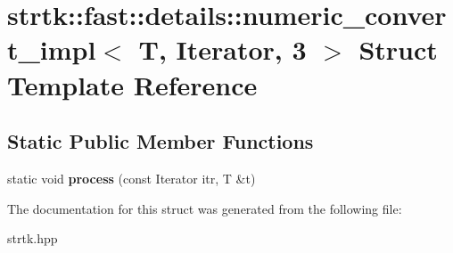 \hypertarget{structstrtk_1_1fast_1_1details_1_1numeric__convert__impl_3_01T_00_01Iterator_00_013_01_4}{\section{strtk\-:\-:fast\-:\-:details\-:\-:numeric\-\_\-convert\-\_\-impl$<$ T, Iterator, 3 $>$ Struct Template Reference}
\label{structstrtk_1_1fast_1_1details_1_1numeric__convert__impl_3_01T_00_01Iterator_00_013_01_4}
}
\subsection*{Static Public Member Functions}
\begin{DoxyCompactItemize}
\item 
\hypertarget{structstrtk_1_1fast_1_1details_1_1numeric__convert__impl_3_01T_00_01Iterator_00_013_01_4_a4a38811433c52a9825738a742d249f02}{static void {\bfseries process} (const Iterator itr, T \&t)}\label{structstrtk_1_1fast_1_1details_1_1numeric__convert__impl_3_01T_00_01Iterator_00_013_01_4_a4a38811433c52a9825738a742d249f02}

\end{DoxyCompactItemize}


The documentation for this struct was generated from the following file\-:\begin{DoxyCompactItemize}
\item 
strtk.\-hpp\end{DoxyCompactItemize}
